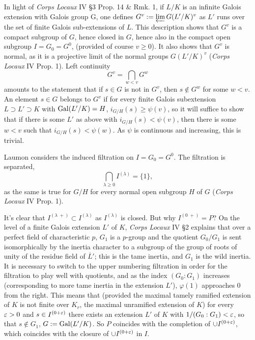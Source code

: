 \documentclass[deligne.tex]{subfiles}
\begin{document}
In light of \emph{Corps Locaux} IV \S3 Prop. 14 \& Rmk. 1, if $L/K$ is an
infinite Galois extension with Galois group G, one defines
$G^v:=\varprojlim G(L'/K)^v$ as $L'$ runs over the set of finite Galois
sub-extensions of $L$.
This description shows that $G^v$ is a compact subgroup of $G$, hence 
closed in $G$, hence also in the compact open subgroup $I=G_0=G^0$,
(provided of course $v\geq0$). It also shows that $G^v$ is normal, as it is 
a projective limit of the normal groups $G(L'/K)^v$
(\emph{Corps Locaux} IV Prop. 1). Left continuity
\begin{equation*}
	G^v=\bigcap_{w<v}G^w
\end{equation*}
amounts to the statement that if $s\in G$ is not in $G^v$, then
$s\not\in G^w$ for some $w<v$.
An element $s\in G$ belongs to $G^v$ if for every
finite Galois subextension $L\supset L'\supset K$ with $\operatorname{Gal}(L'/K)=H$,
$i_{G/H}(s)\geq\psi(v)$, so it will suffice to show that if there is
some $L'$ as above with $i_{G/H}(s)<\psi(v)$, then there is some $w<v$ such
that $i_{G/H}(s)<\psi(w)$.
As $\psi$ is continuous and increasing, this is trivial.

Laumon considers the induced filtration on $I=G_0=G^0$. The filtration is 
separated,
\begin{equation*}
	\bigcap_{\lambda\geq0}I^{(\lambda)}=\{1\},
\end{equation*}
as the same is true for $G/H$ for every normal open subgroup $H$ of $G$
(\emph{Corps Locaux} IV Prop. 1).

It's clear that $I^{(\lambda\;+)}\subset I^{(\lambda)}$ as $I^{(\lambda)}$
is closed. But why $I^{(0\;+)}=P$? On the level of a finite Galois 
extension $L'$ of $K$, \emph{Corps Locaux} IV \S2 explains that over a
perfect field of characteristic $p$, $G_1$ is a $p$-group and the quotient
$G_0/G_1$ is sent isomorphically by the inertia character to a subgroup of
the group of roots of unity of the residue field of $\overline L'$; this is
the tame inertia, and $G_1$ is the wild inertia.
It is necessary to switch to the upper numbering 
filtration in order for the filtration to play well with quotients, and
as the index $(G_0:G_1)$ increases (corresponding to more tame inertia in
the extension $L'$), $\varphi(1)$ approaches 0 from the right.
This means that (provided the maximal tamely ramified extension of $K$ is
not finite over $K_r$, the maximal unramified extension of $K$)
for every $\varepsilon>0$ and $s\in I^{(0+\varepsilon)}$ there
exists an extension $L'$ of $K$ with $1/(G_0:G_1)<\varepsilon$, so that
$s\not\in G_1$, $G:=\operatorname{Gal}(L'/K)$.
So $P$ coincides with the completion of $\cup I^{(0+\varepsilon)}$, which 
coincides with the closure of $\cup I^{(0+\varepsilon)}$ in $I$.
\end{document}
